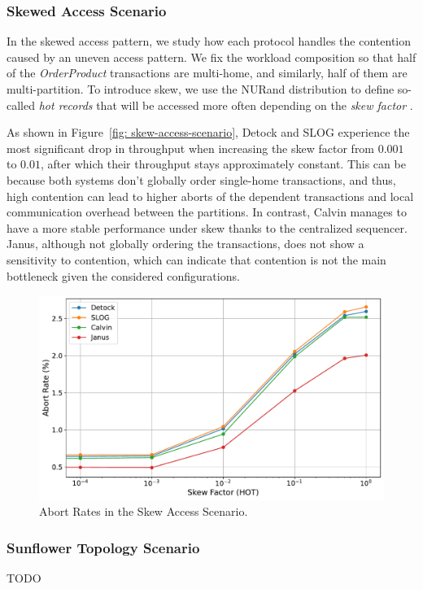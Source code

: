 \subsubsection{Skewed Access Scenario}
In the skewed access pattern, we study how each protocol handles the contention caused by an uneven access pattern. We fix the workload composition so that half of the \textit{OrderProduct} transactions are multi-home, and similarly, half of them are multi-partition. To introduce skew, we use the NURand distribution to define so-called \textit{hot records} that will be accessed more often depending on the \textit{skew factor} \cite{council2010tpc}.

As shown in Figure~\ref{fig: skew-access-scenario}, Detock and SLOG experience the most significant drop in throughput when increasing the skew factor from $0.001$ to $0.01$, after which their throughput stays approximately constant. This can be because both systems don't globally order single-home transactions, and thus, high contention can lead to higher aborts of the dependent transactions and local communication overhead between the partitions. In contrast, Calvin manages to have a more stable performance under skew thanks to the centralized sequencer. Janus, although not globally ordering the transactions, does not show a sensitivity to contention, which can indicate that contention is not the main bottleneck given the considered configurations. 

\begin{figure}[t]
  \centering
  \includegraphics[width=\columnwidth]{figures/Abort Rates.pdf}
  \caption{Abort Rates in the Skew Access Scenario.}
  \label{fig:scalability-scenario}
\end{figure}

\subsubsection{Sunflower Topology Scenario}
TODO

